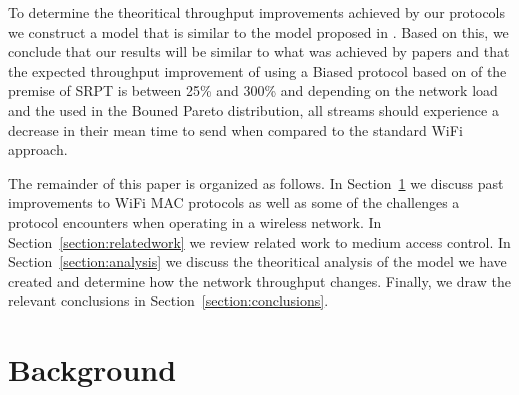 \documentclass{sigcomm-alternate}
\begin{document}

To determine the theoritical throughput improvements achieved by our protocols we construct a model that is similar to the model proposed in \cite{Unfair, Harchol}. Based on this, we conclude that our results will be similar to what was achieved by papers \cite{Unfair, Harchol} and that the expected throughput improvement of using a Biased protocol based on of the premise of SRPT is between 25\% and 300\% and depending on the network load and the \textalpha used in the Bouned Pareto distribution, all streams should experience a decrease in their mean time to send when compared to the standard WiFi approach.

The remainder of this paper is organized as follows. In Section~\ref{section:background} we discuss past improvements to WiFi MAC protocols as well as some of the challenges a protocol encounters when operating in a wireless network. In Section~\ref{section:relatedwork} we review related work to medium access control. In Section~\ref{section:analysis} we discuss the theoritical analysis of the model we have created and determine how the network throughput changes. Finally, we draw the relevant conclusions in Section~\ref{section:conclusions}.


%
%
%
%


\section{Background}
\label{section:background}

\end{document}

